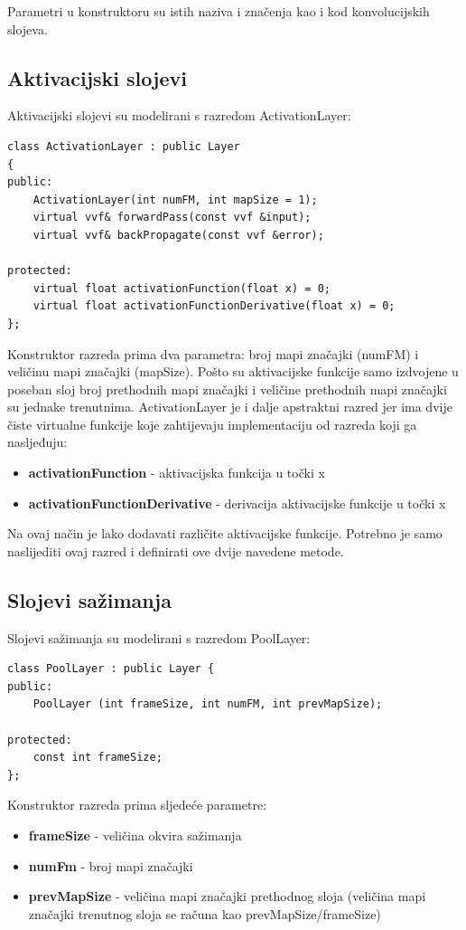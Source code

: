 \documentclass[times, utf8, zavrsni, numeric]{fer}
\begin{document}
Parametri u konstruktoru su istih naziva i značenja kao i kod konvolucijskih slojeva.

\subsection{Aktivacijski slojevi}
Aktivacijski slojevi su modelirani s razredom ActivationLayer:
\begin{lstlisting}[caption=Razred ActivationLayer,
  label=ActivationLayer]
class ActivationLayer : public Layer
{
public:
    ActivationLayer(int numFM, int mapSize = 1);
    virtual vvf& forwardPass(const vvf &input);
    virtual vvf& backPropagate(const vvf &error);

protected:
    virtual float activationFunction(float x) = 0;
    virtual float activationFunctionDerivative(float x) = 0;
};
\end{lstlisting}

Konstruktor razreda prima dva parametra: broj mapi značajki (numFM) i veličinu mapi značajki (mapSize). Pošto su aktivacijske funkcije samo izdvojene u poseban sloj broj prethodnih mapi značajki i veličine prethodnih mapi značajki su jednake trenutnima. ActivationLayer je i dalje apstraktni razred jer ima dvije čiste virtualne funkcije koje zahtijevaju implementaciju od razreda koji ga nasljeđuju:
\begin{itemize}
\item \textbf{activationFunction} - aktivacijska funkcija u točki x
\item \textbf{activationFunctionDerivative} - derivacija aktivacijske funkcije u točki x
\end{itemize}
Na ovaj način je lako dodavati različite aktivacijske funkcije. Potrebno je samo naslijediti ovaj razred i definirati ove dvije navedene metode.


\subsection{Slojevi sažimanja}
Slojevi sažimanja su modelirani s razredom PoolLayer: \\
\begin{lstlisting}[caption=Razred PoolLayer,
  label=PoolLayer]
class PoolLayer : public Layer {
public:
    PoolLayer (int frameSize, int numFM, int prevMapSize); 

protected:
    const int frameSize;
};
\end{lstlisting}

Konstruktor razreda prima sljedeće parametre:
\begin{itemize}
\item \textbf{frameSize} - veličina okvira sažimanja
\item \textbf{numFm} - broj mapi značajki
\item \textbf{prevMapSize} - veličina mapi značajki prethodnog sloja (veličina mapi značajki trenutnog sloja se računa kao prevMapSize/frameSize)
\end{itemize}
\end{document}
